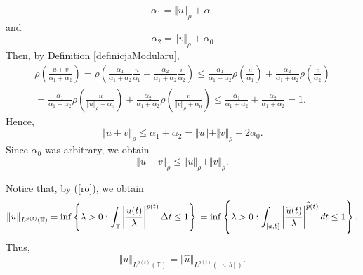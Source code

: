 \documentclass[12pt,a4paper,oneside,titlepage]{article}
\begin{document}
\begin{equation}
\nonumber
\alpha_1 = \Vert u \Vert_{\rho} + \alpha_0
\end{equation}
and
\begin{equation}
\nonumber
\alpha_2 = \Vert v \Vert_{\rho} + \alpha_0
\end{equation}
Then, by Definition \ref{definicjaModularu},
\begin{equation}
\begin{split}
\rho \left( \frac{u+v}{\alpha_1 + \alpha_2} \right)= \rho \left( \frac{\alpha_1}{\alpha_1 +\alpha_2} \frac{u}{\alpha_1} + \frac{\alpha_2}{\alpha_1 +\alpha_2} \frac{v}{\alpha_2} \right) \leq 
\frac{\alpha_1}{\alpha_1 + \alpha_2} \rho \left( \frac{u}{\alpha_1} \right) + \frac{\alpha_2}{\alpha_1 + \alpha_2} \rho \left( \frac{v}{\alpha_2} \right)  \\ =   \frac{\alpha_1}{\alpha_1 + \alpha_2} \rho \left( \frac{u}{\Vert u \Vert_{\rho}+\alpha_0} \right) + \frac{\alpha_2}{\alpha_1 + \alpha_2} \rho \left( \frac{v}{ \Vert v \Vert_{\rho}+\alpha_0} \right) \leq \frac{\alpha_1}{\alpha_1 +\alpha_2} + \frac{\alpha_2}{\alpha_1+\alpha_2}=1 .
\end{split}
\end{equation}
Hence,
\begin{equation}
\nonumber
\Vert u + v \Vert_{\rho} \leq \alpha_1+\alpha_2 = \Vert u \Vert + \Vert v \Vert_{\rho}+2\alpha_0.
\end{equation}
Since $\alpha_0$ was arbitrary, we obtain
\begin{equation}
\nonumber
\Vert u + v \Vert_{\rho } \leq \Vert u \Vert_{\rho} + \Vert v \Vert_{\rho}.
\end{equation}


\bigskip
\indent
Notice that, by (\ref{ro}), we obtain
\begin{equation}
\nonumber
\Vert u \Vert_{L^{p(t)}(\mathbb{T})} = \inf \left\lbrace  \lambda>0 : \int_{\mathbb{T}} \left\vert \frac{u(t)}{\lambda} \right\vert^{p(t)} \Delta t \leq 1   \right\rbrace \\ = \inf \left\lbrace  \lambda>0 : \int_{[a,b]} \left\vert \frac{\widehat{u}(t)}{\lambda} \right\vert^{\widehat{p}(t)} dt \leq 1   \right\rbrace.
\end{equation}
Thus,
\begin{equation}
\Vert u \Vert_{L^{p(t)}(\mathbb{T})} = \Vert \widehat{u} \Vert_{L^{\widehat{p}(t)}([a,b])}.
\end{equation}
\end{document}

